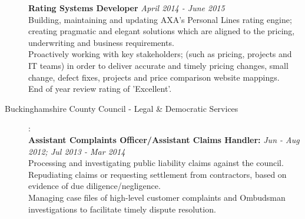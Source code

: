 \documentclass[12pt]{article}
\begin{document}
\begin{description}
\textbf{Rating Systems Developer} \emph{April 2014 - June 2015}\\
Building, maintaining and updating AXA's Personal Lines rating engine; creating pragmatic and elegant solutions which are aligned to the pricing, underwriting and business requirements.\\
Proactively working with key stakeholders; (such as pricing, projects and IT teams) in order to deliver accurate and timely pricing changes, small change, defect fixes, projects and price comparison website mappings.\\
End of year review rating of 'Excellent'.


\item[Buckinghamshire County Council - Legal \& Democratic Services]:\\
\textbf{Assistant Complaints Officer/Assistant Claims Handler:} \emph{Jun - Aug 2012; Jul 2013 - Mar 2014}\\
Processing and investigating public liability claims against the council. Repudiating claims or requesting settlement from contractors, based on evidence of due diligence/negligence.
\\ Managing case files of high-level customer complaints and Ombudsman investigations to facilitate timely dispute resolution.
\end{description}
\end{document}
